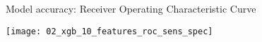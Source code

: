 \begin{frame}{Model accuracy: Receiver Operating Characteristic Curve}


\begin{center}
\texttt{[image: 02\_xgb\_10\_features\_roc\_sens\_spec]}
\end{center}


\end{frame}